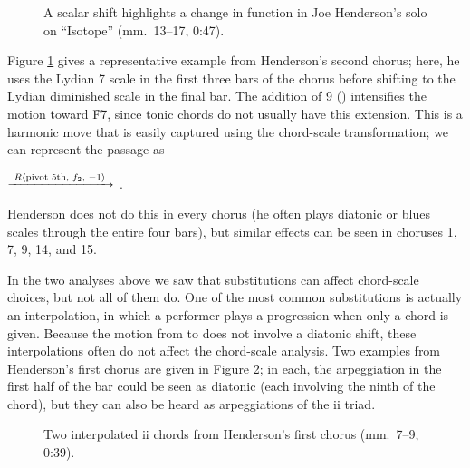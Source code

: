 \begin{figure}[tbp]
  \caption[A scalar shift highlights a change in function in Joe Henderson's
    solo on ``Isotope.'']{A scalar shift highlights a change in function in Joe
    Henderson's solo on ``Isotope'' (mm.~13--17, 0:47).}
  \label{csa:henderson-scale-shift}
\end{figure}

Figure \ref{csa:henderson-scale-shift} gives a representative example from
Henderson's second chorus; here, he uses the Lydian \flat{}7 scale in the first
three bars of the chorus before shifting to the Lydian diminished scale in the
final bar. The addition of \flat{}9 (\Dflat) intensifies the motion toward
\h{F7}, since tonic chords do not usually have this extension. This is a
harmonic move that is easily captured using the chord-scale transformation; we
can represent the passage as \\
{\centering
   $\xrightarrow{\text{ \mbox{\ensuremath{R\langle}pivot 5th, $f_2$, $-1$\ensuremath{\rangle}} }}$
  . \par}
\noindent Henderson does not do this in every chorus (he
often plays diatonic or blues scales through the entire four bars), but
similar effects can be seen in choruses 1, 7, 9, 14, and 15.

In the two analyses above we saw that substitutions can affect chord-scale
choices, but not all of them do. One of the most common substitutions is
actually an interpolation, in which a performer plays a \tf progression when
only a \V chord is given. Because the motion from \ii to \V does not involve a
diatonic shift, these interpolations often do not affect the chord-scale
analysis. Two examples from Henderson's first chorus are given in
Figure \ref{csa:ii7-interpolation}; in each, the arpeggiation in the first
half of the bar could be seen as diatonic (each involving the ninth of the \V
chord), but they can also be heard as arpeggiations of the ii triad.

\begin{figure}[tbp]
  \caption[Two interpolated \ii chords from Henderson's first chorus.]{Two
    interpolated ii chords from Henderson's first chorus (mm.~7--9, 0:39).}
  \label{csa:ii7-interpolation}
\end{figure}

